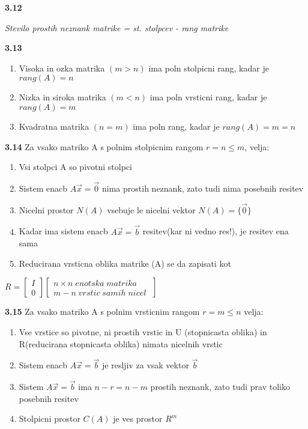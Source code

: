 \documentclass{article}
\begin{document}
\begin{multicols}{4}
	\textbf{3.12}
	\begin{center}
		\textit{Stevilo prostih neznank matrike = st. stolpcev - rang matrike}
	\end{center}

	\textbf{3.13}
	\begin{enumerate}
		\item Visoka in ozka matrika $(m > n)$ ima poln stolpicni rang, kadar je $rang(A) = n$
		\item Nizka in siroka matrika $(m < n)$ ima poln vrsticni rang, kadar je $rang(A) = m$
		\item Kvadratna matrika $(n = m)$ ima poln rang, kadar je $rang(A) = m = n$
	\end{enumerate}

	\textbf{3.14} Za vsako matriko A s polnim stolpicnim rangom $r = n \leq m$, velja:
	\begin{enumerate}
		\item Vsi stolpci A so pivotni stolpci
		\item Sistem enacb $A\vec{x} = \vec{0}$ nima prostih neznank, zato tudi nima posebnih resitev
		\item Nicelni prostor $N(A)$ vsebuje le nicelni vektor $N(A) = \{\vec{0}\}$
		\item Kadar ima sistem enacb $A\vec{x} = \vec{b}$ resitev(kar ni vedno res!), je resitev ena sama
		\item Reducirana vrsticna oblika matrike (A) se da zapisati kot
	\end{enumerate}
	\begin{center}
		$R =
			\begin{bmatrix}
				I \\
				0
			\end{bmatrix}
			\begin{bmatrix}
				n \times n\; enotska\; matrika \\
				m - n\; vrstic\; samih\; nicel\;
			\end{bmatrix}
		$
	\end{center}

	\textbf{3.15} Za vsako matriko A s polnim vrsticnim rangom $r = m \leq n$ velja:
	\begin{enumerate}
		\item Vse vrstice so pivotne, ni prostih vrstic in U (stopnicasta oblika) in R(reducirana stopnicasta oblika) nimata nicelnih vrstic
		\item Sistem enacb $A\vec{x} = \vec{b}$ je resljiv za vsak vektor $\vec{b}$
		\item Sistem $A\vec{x} = \vec{b}$ ima $n-r = n-m$ prostih neznank, zato tudi prav toliko posebnih resitev
		\item Stolpicni prostor $C(A)$ je ves prostor $R^{m}$
	\end{enumerate}


\end{multicols}
\end{document}
